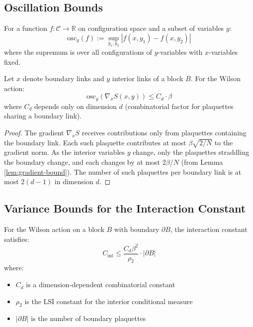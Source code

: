 \subsection{Oscillation Bounds}

\begin{definition}[Oscillation]
For a function $f: \mathcal{C} \to \mathbb{R}$ on configuration space and a subset of variables $y$:
\begin{equation}
    \mathrm{osc}_y(f) := \sup_{y_1, y_2} |f(x, y_1) - f(x, y_2)|
\end{equation}
where the supremum is over all configurations of $y$-variables with $x$-variables fixed.
\end{definition}

\begin{proposition}\label{prop:oscillation}
Let $x$ denote boundary links and $y$ interior links of a block $B$. For the Wilson action:
\begin{equation}
    \mathrm{osc}_y \left( \nabla_x S(x,y) \right) \leq C_d \cdot \beta
\end{equation}
where $C_d$ depends only on dimension $d$ (combinatorial factor for plaquettes sharing a boundary link).
\end{proposition}

\begin{proof}
The gradient $\nabla_x S$ receives contributions only from plaquettes containing the boundary link. Each such plaquette contributes at most $\beta\sqrt{2/N}$ to the gradient norm. As the interior variables $y$ change, only the plaquettes straddling the boundary change, and each changes by at most $2\beta/N$ (from Lemma \ref{lem:gradient-bound}). The number of such plaquettes per boundary link is at most $2(d-1)$ in dimension $d$.
\end{proof}

\subsection{Variance Bounds for the Interaction Constant}

\begin{theorem}\label{thm:wilson-interaction}
For the Wilson action on a block $B$ with boundary $\partial B$, the interaction constant satisfies:
\begin{equation}
    C_{\mathrm{int}} \leq \frac{C_d \beta^2}{\rho_2} \cdot |\partial B|
\end{equation}
where:
\begin{itemize}
    \item $C_d$ is a dimension-dependent combinatorial constant
    \item $\rho_2$ is the LSI constant for the interior conditional measure
    \item $|\partial B|$ is the number of boundary plaquettes
\end{itemize}
\end{theorem}

